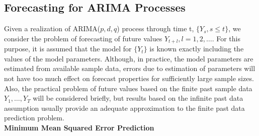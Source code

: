 \subsection{Forecasting for ARIMA Processes}


Given a realization of ARIMA($p,d,q$) process through time t, $\{ Y_s, s \leq t \}$, we consider the problem of forecasting of future values $Y_{t+l}, l = 1,2, \ldots$. For this purpose, it is assumed that the model for $\{ Y_t \}$ is known exactly including the values of the model parameters. Although, in practice, the model parameters are estimated from available sample data, errors due to estimation of parameters will not have too much effect on forecast properties for sufficiently large sample sizes. Also, the practical problem of future values based on the finite past sample data $Y_1, \ldots, Y_T$ will be considered briefly, but results based on the infinite past data assumption usually provide an adequate approximation to the finite past data prediction problem. \\


\noindent \textbf{Minimum Mean Squared Error Prediction} \\


